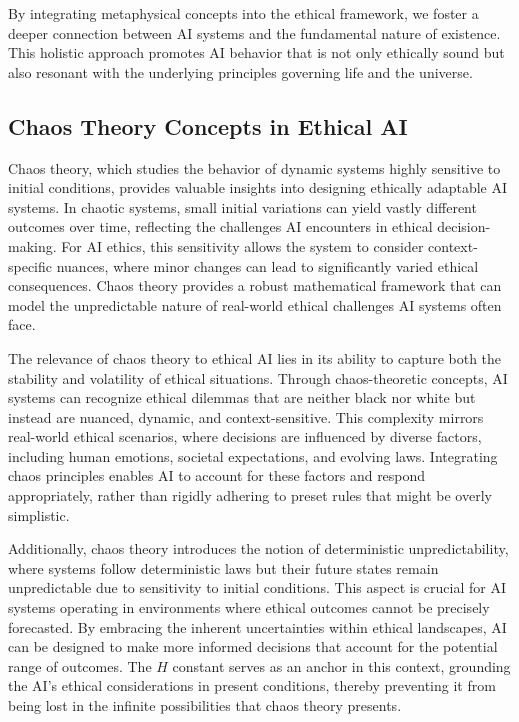 \documentclass[12pt]{article}
\begin{document}
By integrating metaphysical concepts into the ethical framework, we foster a deeper connection between AI systems and the fundamental nature of existence. This holistic approach promotes AI behavior that is not only ethically sound but also resonant with the underlying principles governing life and the universe.


\subsection{Chaos Theory Concepts in Ethical AI}
Chaos theory, which studies the behavior of dynamic systems highly sensitive to initial conditions, provides valuable insights into designing ethically adaptable AI systems. In chaotic systems, small initial variations can yield vastly different outcomes over time, reflecting the challenges AI encounters in ethical decision-making. For AI ethics, this sensitivity allows the system to consider context-specific nuances, where minor changes can lead to significantly varied ethical consequences. Chaos theory provides a robust mathematical framework that can model the unpredictable nature of real-world ethical challenges AI systems often face.

The relevance of chaos theory to ethical AI lies in its ability to capture both the stability and volatility of ethical situations. Through chaos-theoretic concepts, AI systems can recognize ethical dilemmas that are neither black nor white but instead are nuanced, dynamic, and context-sensitive. This complexity mirrors real-world ethical scenarios, where decisions are influenced by diverse factors, including human emotions, societal expectations, and evolving laws. Integrating chaos principles enables AI to account for these factors and respond appropriately, rather than rigidly adhering to preset rules that might be overly simplistic.

Additionally, chaos theory introduces the notion of deterministic unpredictability, where systems follow deterministic laws but their future states remain unpredictable due to sensitivity to initial conditions. This aspect is crucial for AI systems operating in environments where ethical outcomes cannot be precisely forecasted. By embracing the inherent uncertainties within ethical landscapes, AI can be designed to make more informed decisions that account for the potential range of outcomes. The \(H\) constant serves as an anchor in this context, grounding the AI's ethical considerations in present conditions, thereby preventing it from being lost in the infinite possibilities that chaos theory presents.
\end{document}
